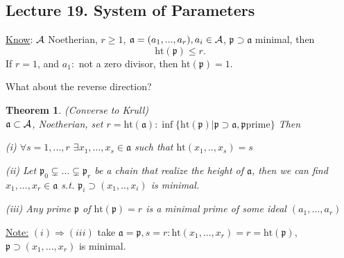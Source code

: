 \documentclass[11pt]{article}
\newtheorem{thm}{Theorem}[section]
\newcommand{\sca}{{\mathfrak a}}
\newcommand{\scp}{{\mathfrak p}}
\newcommand{\cala}{{\cal A}}
\newcommand{\Lrta}{\Longrightarrow}
\begin{document}
\subsection{Lecture 19. System of Parameters}
\underline{Know}:
$\cala$ Noetherian, $r\geq 1$, $\sca=(a_1,...,a_r), a_i\in\cala$, $\scp\supset \sca$ minimal, then 
$$
\text{ht}(\scp)\leq r.
$$
If $r=1$, and $a_1:$ not a zero divisor, then $\text{ht}(\scp)=1$.

What about the reverse direction?

\begin{thm}\label{thm:Krull_converse}
(Converse to Krull)\\
$\sca\subset \cala$, Noetherian,  set $r=\text{ht}(\sca):\inf\{\text{ht}(\scp)|\scp\supset \sca,\scp\text{prime}\}$
Then 

(i) $\forall s=1,...,r$ $\exists x_1,...,x_s\in\sca$ such that $\text{ht}(x_1,..,x_s)=s$

(ii) Let $\scp_0\subsetneq ...\subsetneq \scp_r$ be a chain that realize the height of $\sca$, then we can find $x_1,...,x_r\in\sca$ s.t. $\scp_i\supset(x_1,..,x_i)$ is minimal.

(iii) Any prime $\scp$ of $\text{ht}(\scp)=r$ is a minimal prime of some ideal $(a_1,...,a_r)$
\end{thm}
\underline{Note:} $(i)\Lrta(iii)$ take $\sca=\scp,s=r:\text{ht}(x_1,...,x_r)=r=\text{ht}(\scp)$, $\scp\supset (x_1,...,x_r)$ is minimal. 
\end{document}
